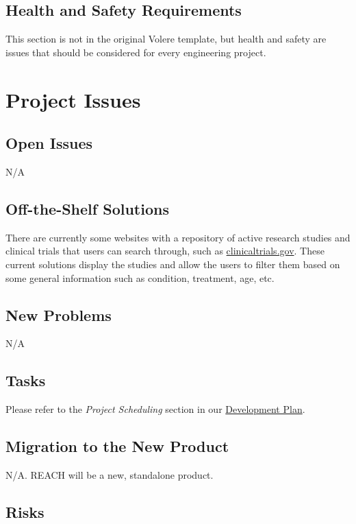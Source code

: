\documentclass[12pt, titlepage]{article}
\begin{document}
\subsection{Health and Safety Requirements}

This section is not in the original Volere template, but health and safety are
issues that should be considered for every engineering project.

\section{Project Issues}

\subsection{Open Issues}

N/A

\subsection{Off-the-Shelf Solutions}

There are currently some websites with a repository of active research studies and clinical trials that users can search through, such as 
\href{https://clinicaltrials.gov/}{clinicaltrials.gov}. These current solutions display the studies and allow the users to filter them based 
on some general information such as condition, treatment, age, etc.

\subsection{New Problems}

N/A

\subsection{Tasks}

Please refer to the \textit{Project Scheduling} section in our
\href{https://github.com/davimang/REACH/blob/main/docs/DevelopmentPlan/DevelopmentPlan.pdf}{Development Plan}.


\subsection{Migration to the New Product}

N/A. REACH will be a new, standalone product.

\subsection{Risks}
\end{document}
